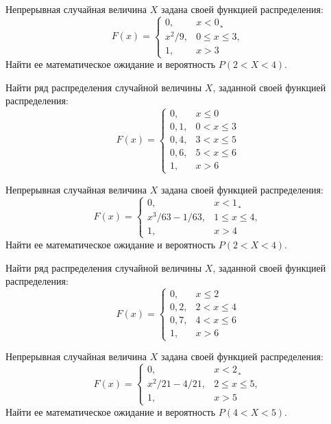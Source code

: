 \vfill

\z Непрерывная случайная величина $X$ задана своей функцией распределения: $$ F(x) = \begin{cases}0, & x < 0¸\\ x^2/9, & 0 \leqslant x \leqslant 3, \\ 1, & x > 3 \end{cases} $$ Найти ее математическое ожидание и вероятность $P(2 < X < 4)$.
 

\vfill

\newpage\setcounter{zad}{0}

\z Найти ряд распределения случайной величины $X$, заданной своей функцией распределения: $$ F(x) = \begin{cases}0, & x \leqslant 0 \\ 0{,}1, & 0 < x \leqslant 3 \\ 0{,}4, & 3 < x \leqslant 5 \\ 0{,}6, & 5 < x \leqslant 6 \\ 1, & x > 6 \end{cases} $$


\vfill

\z Непрерывная случайная величина $X$ задана своей функцией распределения: $$ F(x) = \begin{cases}0, & x < 1¸\\ x^3/63-1/63, & 1 \leqslant x \leqslant 4, \\ 1, & x > 4 \end{cases} $$ Найти ее математическое ожидание и вероятность $P(2 < X < 4)$.
 

\vfill

\newpage\setcounter{zad}{0}

\z Найти ряд распределения случайной величины $X$, заданной своей функцией распределения: $$ F(x) = \begin{cases}0, & x \leqslant 2 \\ 0{,}2, & 2 < x \leqslant 4 \\ 0{,}7, & 4 < x \leqslant 6 \\ 1, & x > 6 \end{cases} $$


\vfill

\z Непрерывная случайная величина $X$ задана своей функцией распределения: $$ F(x) = \begin{cases}0, & x < 2¸\\ x^2/21-4/21, & 2 \leqslant x \leqslant 5, \\ 1, & x > 5 \end{cases} $$ Найти ее математическое ожидание и вероятность $P(4 < X < 5)$.
 

